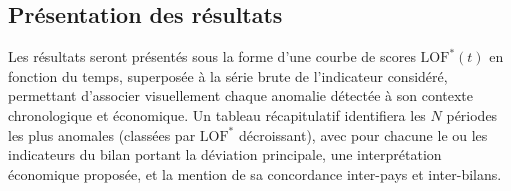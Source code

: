 \documentclass[12pt, a4paper]{article}
\begin{document}
\subsection{Présentation des résultats}
\label{subsec:presentation}

Les résultats seront présentés sous la forme d'une courbe de scores
$\text{LOF}^*(t)$ en fonction du temps, superposée à la série brute de
l'indicateur considéré, permettant d'associer visuellement chaque anomalie
détectée à son contexte chronologique et économique. Un tableau récapitulatif
identifiera les $N$ périodes les plus anomales (classées par $\text{LOF}^*$
décroissant), avec pour chacune le ou les indicateurs du bilan portant la
déviation principale, une interprétation économique proposée, et la mention
de sa concordance inter-pays et inter-bilans.

%
\end{document}
